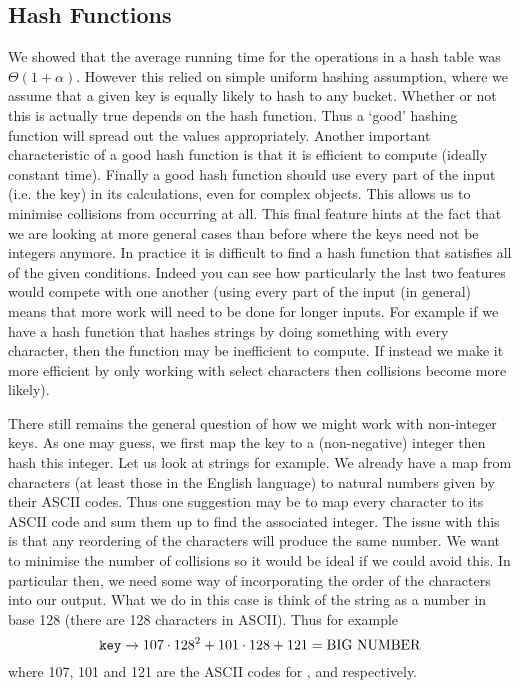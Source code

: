 \subsection{Hash Functions}
We showed that the average running time for the operations in a hash table was $\Theta(1 + \alpha)$. However this relied on simple uniform hashing assumption, where we assume that a given key is equally likely to hash to any bucket. Whether or not this is actually true depends on the hash function. Thus a `good' hashing function will spread out the values appropriately. Another important characteristic of a good hash function is that it is efficient to compute (ideally constant time). Finally a good hash function should use every part of the input (i.e. the key) in its calculations, even for complex objects. This allows us to minimise collisions from occurring at all. This final feature hints at the fact that we are looking at more general cases than before where the keys need not be integers anymore. In practice it is difficult to find a hash function that satisfies all of the given conditions. Indeed you can see how particularly the last two features would compete with one another (using every part of the input (in general) means that more work will need to be done for longer inputs. For example if we have a hash function that hashes strings by doing something with every character, then the function may be inefficient to compute. If instead we make it more efficient by only working with select characters then collisions become more likely). 

There still remains the general question of how we might work with non-integer keys. As one may guess, we first map the key to a (non-negative) integer then hash this integer. Let us look at strings for example. We already have a map from characters (at least those in the English language) to natural numbers given by their ASCII codes. Thus one suggestion may be to map every character to its ASCII code and sum them up to find the associated integer. The issue with this is that any reordering of the characters will produce the same number. We want to minimise the number of collisions so it would be ideal if we could avoid this. In particular then, we need some way of incorporating the order of the characters into our output. What we do in this case is think of the string as a number in base 128 (there are 128 characters in ASCII). Thus for example
$$ \texttt{key} \to 107 \cdot 128^2 + 101 \cdot 128 + 121 = \text{BIG NUMBER} $$
where 107, 101 and 121 are the ASCII codes for ,  and  respectively.

